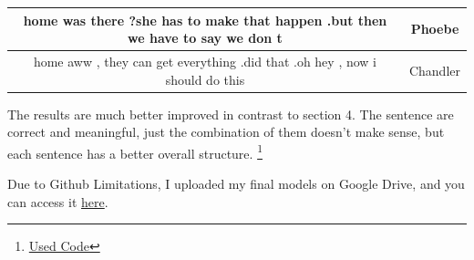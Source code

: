 \documentclass{article}
\begin{document}
\begin{center}
\begin{tabular}{ |c|c| } 
 \hline
 home was there ?she has to make that happen .but then we have to say we don t & Phoebe  \\ 
 \hline
 home aww , they can get everything .did that .oh hey , now i should do this & Chandler \\ 
 \hline
\end{tabular}
\end{center}

\par The results are much better improved in contrast to section 4. The sentence are correct and meaningful, just the combination of them doesn't make sense, but each sentence has a better overall structure. \footnote{\href{https://colab.research.google.com/github/huggingface/notebooks/blob/master/examples/language_modeling.ipynb}{Used Code}}\\

\par Due to Github Limitations, I uploaded my final models on Google Drive, and you can access it \href{https://drive.google.com/drive/folders/1xT46pVDgnjKds5NsGvAQKsCefXTYA6rZ?usp=sharing}{here}.
\end{document}
